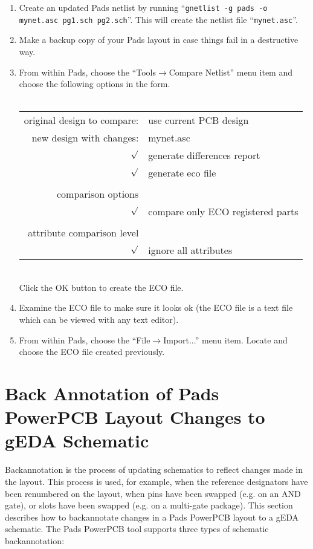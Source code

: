 \documentclass{article}
\begin{document}
\begin{enumerate}
\item Create an updated Pads netlist by running ``{\tt gnetlist -g pads
    -o mynet.asc pg1.sch pg2.sch}''.  This will create the netlist
  file ``{\tt mynet.asc}''.

\item Make a backup copy of your Pads layout in case things fail in a
  destructive way.

\item From within Pads, choose the ``Tools$\rightarrow$Compare
  Netlist'' menu item and choose the following options in the form.\\
  \\
  \begin{tabular}{|r l|}
    \hline 
    original design to compare:& use current PCB design \\
    new design with changes:& mynet.asc \\
     $\surd$&generate differences report \\
     $\surd$&generate eco file\\
     &\\
     comparison options &\\
     $\surd$&compare only ECO registered parts\\
     &\\
     attribute comparison level &\\
     $\surd$&ignore all attributes\\
    \hline 
  \end{tabular}
  \\
  Click the OK button to create the ECO file.

\item Examine the ECO file to make sure it looks ok (the ECO file is a
  text file which can be viewed with any text editor).

\item From within Pads, choose the ``File$\rightarrow$Import...''
  menu item.  Locate and choose the ECO file created previously.

\end{enumerate}

\section{Back Annotation of Pads PowerPCB Layout Changes to gEDA Schematic}
Backannotation is the process of updating schematics to reflect
changes made in the layout.  This process is used, for example, when
the reference designators have been renumbered on the layout, when
pins have been swapped (e.g. on an AND gate), or slots have been
swapped (e.g. on a multi-gate package).  This section describes how to
backannotate changes in a Pads PowerPCB layout to a gEDA schematic.
The Pads PowerPCB tool supports three types of schematic
backannotation:
\end{document}
